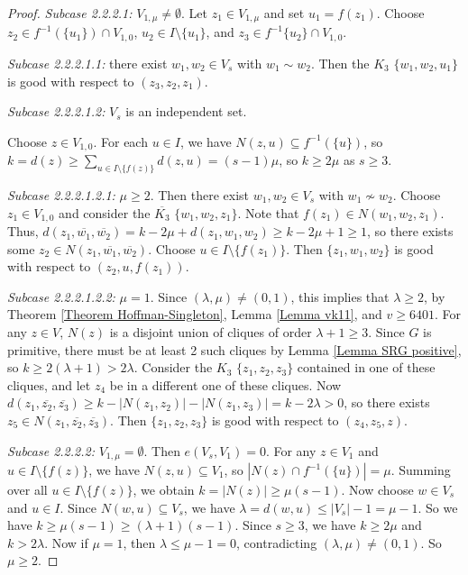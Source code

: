 \documentclass{article}
\newcommand\sm{\setminus}
\theoremstyle{definition}
\begin{document}
\begin{proof}
    \textit{Subcase 2.2.2.1:} $V_{1,\mu}\ne\emptyset$. Let $z_1\in V_{1,\mu}$ and set $u_1=f(z_1)$. Choose $z_2\in f^{-1}(\{u_1\})\cap V_{1,0}$, $u_2\in I\sm\{u_1\}$, and $z_3\in f^{-1}\{u_2\}\cap V_{1,0}$.

    \textit{Subcase 2.2.2.1.1:} there exist $w_1,w_2\in V_s$ with $w_1\sim w_2$. Then the $K_3$ $\{w_1,w_2,u_1\}$ is good with respect to $(z_3,z_2,z_1)$.

    \textit{Subcase 2.2.2.1.2:} $V_s$ is an independent set. 

    Choose $z\in V_{1,0}$. For each $u\in I$, we have $N(z,u)\subseteq f^{-1}(\{u\})$, so $k=d(z)\ge\sum_{u\in I\sm\{f(z)\}}d(z,u)=(s-1)\mu$, so $k\ge 2\mu$ as $s\ge 3$.

    \textit{Subcase 2.2.2.1.2.1:} $\mu\ge 2$. Then there exist $w_1,w_2\in V_s$ with $w_1\not\sim w_2$. Choose $z_1\in V_{1,0}$ and consider the $\overline{K_3}$ $\{w_1,w_2,z_1\}$. Note that $f(z_1)\in N(w_1,w_2,z_1)$. Thus, $d(z_1,\overline{w_1},\overline{w_2})=k-2\mu+d(z_1,w_1,w_2)\ge k-2\mu+1\ge 1$, so there exists some $z_2\in N(z_1,\overline{w_1},\overline{w_2})$. Choose $u\in I\sm\{f(z_1)\}$. Then $\{z_1,w_1,w_2\}$ is good with respect to $(z_2,u,f(z_1))$.

    \textit{Subcase 2.2.2.1.2.2:} $\mu=1$. Since $(\lambda,\mu)\ne(0,1)$, this implies that $\lambda\ge 2$, by Theorem \ref{Theorem Hoffman-Singleton}, Lemma \ref{Lemma vk11}, and $v\ge 6401$. For any $z\in V$, $N(z)$ is a disjoint union of cliques of order $\lambda+1\ge 3$. Since $G$ is primitive, there must be at least 2 such cliques by Lemma \ref{Lemma SRG positive}, so $k\ge2(\lambda+1)>2\lambda$. Consider the $K_3$ $\{z_1,z_2,z_3\}$ contained in one of these cliques, and let $z_4$ be in a different one of these cliques. Now $d(z_1,\overline{z_2},\overline{ z_3})\ge k-|N(z_1,z_2)|-|N(z_1,z_3)|=k-2\lambda>0$, so there exists $z_5\in N(z_1,\overline{z_2},\overline{z_3})$. Then $\{z_1,z_2,z_3\}$ is good with respect to $(z_4,z_5,z)$.

    \textit{Subcase 2.2.2.2:} $V_{1,\mu}=\emptyset$. Then $e(V_s,V_1)=0$. For any $z\in V_1$ and $u\in I\sm\{f(z)\}$, we have $N(z,u)\subseteq V_1$, so $|N(z)\cap f^{-1}(\{u\})|=\mu$. Summing over all $u\in I\sm\{f(z)\}$, we obtain $k=|N(z)|\ge\mu(s-1)$. Now choose $w\in V_s$ and $u\in I$. Since $N(w,u)\subseteq V_s$, we have $\lambda=d(w,u)\le|V_s|-1=\mu-1$. So we have $k\ge\mu(s-1)\ge(\lambda+1)(s-1)$. Since $s\ge 3$, we have $k\ge2\mu$ and $k>2\lambda$. Now if $\mu=1$, then $\lambda\le\mu-1=0$, contradicting $(\lambda,\mu)\ne(0,1)$. So $\mu\ge 2$.


\end{proof}
\end{document}
